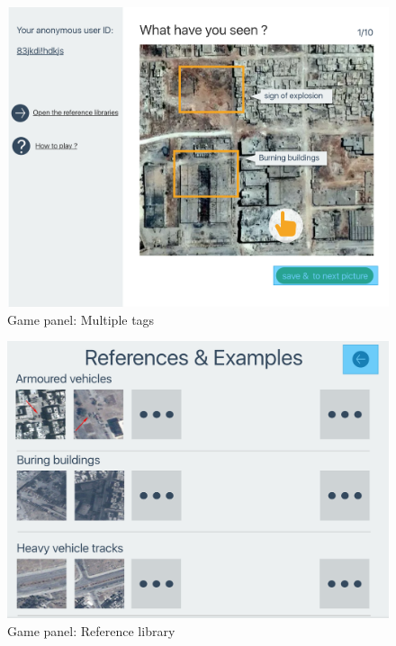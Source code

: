       \noindent\begin{minipage}{.45\textwidth}
      \begin{figure}[H]
      \centering
      \includegraphics[width=\textwidth]{figures/function-player-2}
      \caption{Game panel: Multiple tags}
      \label{fig:player2}
      \end{figure}
      \end{minipage}\hfill
      \noindent\begin{minipage}{.45\textwidth}
      \begin{figure}[H]
      \centering
      \includegraphics[width=\textwidth]{figures/function-player-3}
      \caption{Game panel: Reference library}
      \label{fig:player3}
      \end{figure}
      \end{minipage}\hfill

